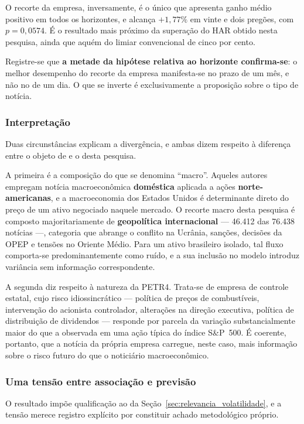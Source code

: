 O recorte da empresa, inversamente, é o único que apresenta ganho médio positivo em todos os
horizontes, e alcança $+1{,}77\%$ em vinte e dois pregões, com $p = 0{,}0574$. É o resultado mais
próximo da superação do HAR obtido nesta pesquisa, ainda que aquém do limiar convencional de cinco
por cento.

Registre-se que \textbf{a metade da hipótese relativa ao horizonte confirma-se}: o melhor desempenho
do recorte da empresa manifesta-se no prazo de um mês, e não no de um dia. O que se inverte é
exclusivamente a proposição sobre o tipo de notícia.

\subsubsection{Interpretação}

Duas circunstâncias explicam a divergência, e ambas dizem respeito à diferença entre o objeto de
 e o desta pesquisa.

A primeira é a composição do que se denomina ``macro''. Aqueles autores empregam notícia
macroeconômica \textbf{doméstica} aplicada a ações \textbf{norte-americanas}, e a macroeconomia dos
Estados Unidos é determinante direto do preço de um ativo negociado naquele mercado. O recorte macro
desta pesquisa é composto majoritariamente de \textbf{geopolítica internacional} --- 46.412 das
76.438 notícias ---, categoria que abrange o conflito na Ucrânia, sanções, decisões da OPEP e
tensões no Oriente Médio. Para um ativo brasileiro isolado, tal fluxo comporta-se predominantemente
como ruído, e a sua inclusão no modelo introduz variância sem informação correspondente.

A segunda diz respeito à natureza da PETR4. Trata-se de empresa de controle estatal, cujo risco
idiossincrático --- política de preços de combustíveis, intervenção do acionista controlador,
alterações na direção executiva, política de distribuição de dividendos --- responde por parcela da
variação substancialmente maior do que a observada em uma ação típica do índice S\&P~500. É
coerente, portanto, que a notícia da própria empresa carregue, neste caso, mais informação sobre o
risco futuro do que o noticiário macroeconômico.

\subsubsection{Uma tensão entre associação e previsão}

O resultado impõe qualificação ao da Seção~\ref{sec:relevancia_volatilidade}, e a tensão merece
registro explícito por constituir achado metodológico próprio.

